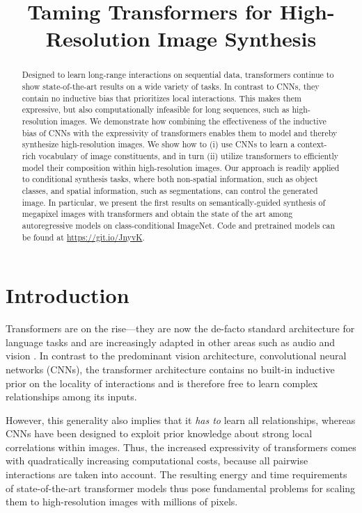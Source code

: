 \title{Taming Transformers for High-Resolution Image Synthesis}

\begin{abstract}
 Designed to learn long-range interactions on sequential data, transformers continue to show state-of-the-art results on a wide variety of tasks.  In contrast to CNNs, they contain no inductive bias that prioritizes local interactions. This makes them expressive, but also computationally infeasible for long sequences, such as high-resolution images. We demonstrate how combining the effectiveness of the inductive bias of CNNs with the expressivity of transformers enables them to model and thereby synthesize high-resolution images. We show how to (i) use CNNs to learn a context-rich vocabulary of image constituents, and in turn (ii) utilize transformers to efficiently model their composition within high-resolution images. Our approach is readily applied to conditional synthesis tasks, where both non-spatial information, such as object classes, and spatial information, such as segmentations, can control the generated image. In particular, we present the first results on semantically-guided synthesis of megapixel images with transformers and obtain the state of the art among autoregressive models on class-conditional ImageNet. Code and pretrained models can be found at \url{https://git.io/JnyvK}.
\end{abstract}

\section{Introduction}

 Transformers are on the rise---they are now the de-facto standard architecture for language tasks \cite{vaswani2017attention,Radford2018ImprovingLU,Radford2019LanguageMA,brown2020language} and are increasingly adapted in other areas such as audio \cite{child2019generating} and vision \cite{chen2020generative,
anonymous2021an}. In contrast to the predominant vision architecture, convolutional neural networks (CNNs), the transformer architecture contains no built-in inductive prior on the locality of interactions and is therefore free to learn complex relationships among its inputs.
\enlargethispage{1\baselineskip}

However, this generality also implies that it \emph{has to} learn all relationships, whereas CNNs have been designed to exploit prior knowledge about strong local correlations within images. Thus, the increased expressivity of transformers comes with quadratically increasing computational costs, because all pairwise interactions are taken into account. The resulting energy and time requirements of state-of-the-art transformer models thus pose fundamental problems for scaling them to high-resolution images with millions of pixels.

